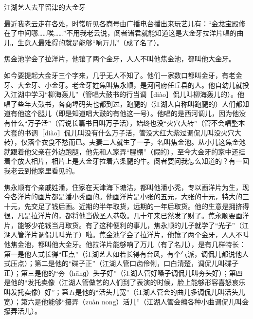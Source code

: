 \documentclass[12pt,UTF8]{ctexbook}
\begin{document}
江湖艺人去平留津的大金牙


最近我老云走在各处，时常听见各商号由广播电台播出来玩艺儿有：“金龙宝殿修在了中间哪……唉……”不用我老云说，阅者诸君就能知道这是大金牙拉洋片唱的曲儿，生意人最难得的就是能够“响万儿”（成了名了）。

焦金池学会了拉洋片，他镶了两个金牙，人人不叫他焦金池，都叫他大金牙。



如今要提起大金牙三个字来，几乎无人不知了。他们一家数口都叫金牙，有老金牙、大金牙、小金牙。老金牙姓焦叫焦永顺，是河间府任丘县的人。他自幼儿就投入江湖中学习“柳海轰儿”（管唱大鼓书的行当调［diào］侃儿叫柳海轰儿的）。他唱了些年大鼓书，各商埠码头也都到过，跑腿的（江湖人自称叫跑腿的）人们都知道有他这个腿儿（即是知道唱大鼓的有他这一号）。他唱的是西河调儿，因为他没有什么“万子活”（管说长篇书目叫万子活），始终也没“火穴大转”（管不会唱整本大套的书调［diào］侃儿叫没有什么万子活，管没大红大紫过调侃儿叫没火穴大转），仅落个衣食不愁而已。夫妻二人就生了一子，名叫焦金池。从小儿这焦金池就跟着他父亲在外边跑腿，他先和人家弄“腥棚”（假的），至今大金牙的家中还挂着个放大相片，相片上是大金牙拉着六条腿的牛。阅者要问我怎么知道的？有一回我老云到他家里看见的。

焦永顺有个亲戚姓潘，住家在天津海下塘沽，都叫他潘小秃，专以画洋片为生，现今各洋片的画片都是潘小秃画的。他画洋片是小张的五元，大张的十元，特大的三十元，先交足了钱后画。近期的半年取货，远期的一年后取货。他的生意是拥挤得很，凡是拉洋片的，都将他当做圣人恭敬。几十年来已然发了财了。焦永顺要画洋片，能够少花钱当月取货。有了这种便利的事儿，焦永顺的儿子就学了“光子”（江湖人管洋片调侃儿叫光子）啦。焦金池学会了拉洋片，他镶了两个金牙，人人不叫他焦金池，都叫他大金牙。他拉洋片能够响了万儿（有了名儿），是有几样特长：第一是他人式长得“压点”（江湖艺人如若长得有台风，有个气派，调侃儿都说他人式压点）；第二是他的“碟子正”（江湖人管口齿伶俐，口白清楚，调侃儿叫碟子正）；第三是他的“夯（hānɡ）头子好”（江湖人管好嗓子调侃儿叫夯头好）；第四是他的“发托卖像（江湖人管做艺的人们到了表演的时候，脸上能够形容喜怒哀乐叫发托卖像）好”；第五是他的“活头儿宽”（江湖人管会的曲儿多调侃儿叫活头儿宽）；第六是他能够“攥弄（zuàn nong）活儿”（江湖人管会编各种小曲调侃儿叫会攥弄活儿）。
\end{document}
